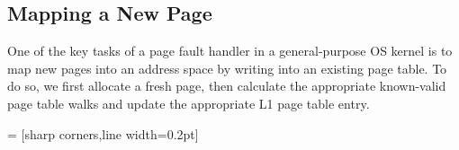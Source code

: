 \subsection{Mapping a New Page}
One of the key tasks of a page fault handler in a general-purpose OS kernel is
to map new pages into an address space by writing into an existing page table.
To do so, we first allocate a fresh page, then calculate the appropriate
known-valid page table walks and update the appropriate L1 page table entry.

\newcommand{\qfraczero}{\textsf{qfrac}}
\newcommand{\true}{\textsf{true}}
 = [sharp corners,line width=0.2pt]
\NewDocumentCommand {}
\newcommand*{\knowInvpv}[2]{\boxedassertpv{#2}[#1]}
\newcommand*{\ownGhostpv}[2]{\boxedassertpv[dash dot]{#2}[#1]}

\newcommand{\sumpv}[3]{
  \ownGhostpv\gammaPred{\authfrag{\singletonMap{#1}{(#2, #3)}}}
}

\newcommand{\pvmapping}[1]{\mathcal{A}\textsf{PVMappings}(#1)}


\newcommand{\fpaddr}{\texttt{fpaddr}}
\newcommand{\specline}[1]{{\color{blue}\left\{#1\right\}}}
\newcommand{\sumapacesfull}[2]{
  \ownGhost\gammaPreds{\authfull{\singletonMap{#1}{#2}}}
}

